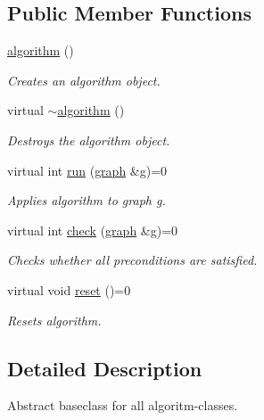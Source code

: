\subsection*{Public Member Functions}
\begin{DoxyCompactItemize}
\item 
\mbox{\label{classalgorithm_ab79e1ddec2f2afdf4b36b10724db8b15}} 
\mbox{\hyperlink{classalgorithm_ab79e1ddec2f2afdf4b36b10724db8b15}{algorithm}} ()
\begin{DoxyCompactList}\small\item\em Creates an algorithm object. \end{DoxyCompactList}\item 
\mbox{\label{classalgorithm_adca9b1e7fa3afd914519a9dbb44e9fd5}} 
virtual \mbox{\hyperlink{classalgorithm_adca9b1e7fa3afd914519a9dbb44e9fd5}{$\sim$algorithm}} ()
\begin{DoxyCompactList}\small\item\em Destroys the algorithm object. \end{DoxyCompactList}\item 
virtual int \mbox{\hyperlink{classalgorithm_a734b189509a8d6b56b65f8ff772d43ca}{run}} (\mbox{\hyperlink{classgraph}{graph}} \&g)=0
\begin{DoxyCompactList}\small\item\em Applies algorithm to graph g. \end{DoxyCompactList}\item 
virtual int \mbox{\hyperlink{classalgorithm_a76361fb03ad1cf643affc51821e43bed}{check}} (\mbox{\hyperlink{classgraph}{graph}} \&g)=0
\begin{DoxyCompactList}\small\item\em Checks whether all preconditions are satisfied. \end{DoxyCompactList}\item 
virtual void \mbox{\hyperlink{classalgorithm_a21aba63d066ae7897de6ca7d8425c408}{reset}} ()=0
\begin{DoxyCompactList}\small\item\em Resets algorithm. \end{DoxyCompactList}\end{DoxyCompactItemize}


\subsection{Detailed Description}
Abstract baseclass for all algoritm-\/classes. 

